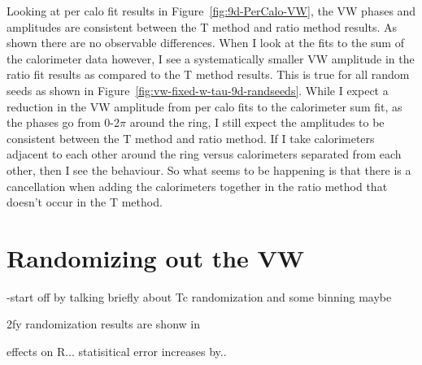 \documentclass[12pt,letterpaper]{article}
\newcommand{\figref}[1]{Figure~\ref{#1}}
\begin{document}
\clearpage


 Looking at per calo fit results in \figref{fig:9d-PerCalo-VW}, the VW phases and amplitudes are consistent between the T method and ratio method results. As shown there are no observable differences. When I look at the fits to the sum of the calorimeter data however, I see a systematically smaller VW amplitude in the ratio fit results as compared to the T method results. This is true for all random seeds as shown in \figref{fig:vw-fixed-w-tau-9d-randseeds}. While I expect a reduction in the VW amplitude from per calo fits to the calorimeter sum fit, as the phases go from 0-2$\pi$ around the ring, I still expect the amplitudes to be consistent between the T method and ratio method. If I take calorimeters adjacent to each other around the ring versus calorimeters separated from each other, then I see the behaviour. So what seems to be happening is that there is a cancellation when adding the calorimeters together in the ratio method that doesn't occur in the T method. 











\section{Randomizing out the VW}
\label{sec:randomization}


-start off by talking briefly about Tc randomization and some binning maybe

2fy randomization results are shonw in \cite{wa_presentation}


effects on R...
statisitical error increases by.. 
\end{document}
